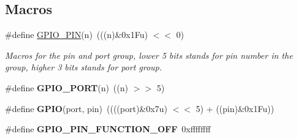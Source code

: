 \subsection*{Macros}
\begin{DoxyCompactItemize}
\item 
\mbox{\label{group___h_p_l_ga50e2e0aca2b651e066ebc5aeb5fdad25}} 
\#define \hyperlink{group___h_p_l_ga50e2e0aca2b651e066ebc5aeb5fdad25}{G\+P\+I\+O\+\_\+\+P\+IN}(n)~(((n)\&0x1\+Fu) $<$$<$ 0)
\begin{DoxyCompactList}\small\item\em Macros for the pin and port group, lower 5 bits stands for pin number in the group, higher 3 bits stands for port group. \end{DoxyCompactList}\item 
\mbox{\label{group___h_p_l_ga9797315af6a0aa3291bb73648a3b1379}} 
\#define {\bfseries G\+P\+I\+O\+\_\+\+P\+O\+RT}(n)~((n) $>$$>$ 5)
\item 
\mbox{\label{group___h_p_l_gaf065b9160b968f60a562bdc5c4454a5a}} 
\#define {\bfseries G\+P\+IO}(port,  pin)~((((port)\&0x7u) $<$$<$ 5) + ((pin)\&0x1\+Fu))
\item 
\mbox{\label{group___h_p_l_ga4ac520942c3dfa92e76b896518718576}} 
\#define {\bfseries G\+P\+I\+O\+\_\+\+P\+I\+N\+\_\+\+F\+U\+N\+C\+T\+I\+O\+N\+\_\+\+O\+FF}~0xffffffff
\end{DoxyCompactItemize}
